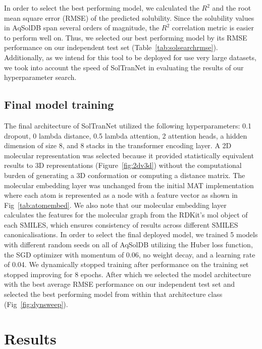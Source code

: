 \documentclass[journal=jcim,manuscript=applicationnotes]{achemso}
\begin{document}
In order to select the best performing model, we calculated the $R^2$ and the root mean square error (RMSE) of the predicted solubility.
Since the solubility values in AqSolDB span several orders of magnitude, the $R^2$ correlation metric is easier to perform well on.
Thus, we selected our best performing model by its RMSE performance on our independent test set (Table~\ref{tab:solsearchrmse}).
Additionally, as we intend for this tool to be deployed for use very large datasets, we took into account the speed of SolTranNet in evaluating the results of our hyperparameter search. 

\subsection{Final model training}
The final architecture of SolTranNet utilized the following hyperparameters: 0.1 dropout, 0 lambda distance, 0.5 lambda attention, 2 attention heads, a hidden dimension of size 8, and 8 stacks in the transformer encoding layer. 
A 2D molecular representation was selected because it provided statistically equivalent results to 3D representations (Figure~\ref{fig:2dv3d}) without the computational burden of generating a 3D conformation or computing a distance matrix.
The molecular embedding layer was unchanged from the initial MAT implementation\cite{MAT} where each atom is represented as a node with a feature vector as shown in Fig~\ref{tab:atomembed}.
We also note that our molecular embedding layer calculates the features for the molecular graph from the RDKit's mol object of each SMILES, which ensures consistency of results across different SMILES canonicalisations.
In order to select the final deployed model, we trained 5 models with different random seeds on all of AqSolDB utilizing the Huber loss function, the SGD optimizer with momentum of 0.06, no weight decay, and a learning rate of 0.04.
We dynamically stopped training after performance on the training set stopped improving for 8 epochs.
After which we selected the model architecture with the best average RMSE performance on our independent test set and selected the best performing model from within that architecture class (Fig~\ref{fig:dynsweep}).

\section{Results}
\end{document}
